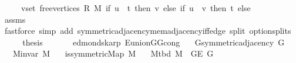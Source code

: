 \begin{isabellebody}
\ \ \ \ \ {\isacharparenleft}{\kern0pt}{\isasymUnion}v{\isasymin}set\ {\isacharparenleft}{\kern0pt}free{\isacharunderscore}{\kern0pt}vertices\ R\ M{\isacharparenright}{\kern0pt}{\isachardot}{\kern0pt}\ if\ u\ {\isacharequal}{\kern0pt}\ t\ then\ {\isacharbraceleft}{\kern0pt}v{\isacharbraceright}{\kern0pt}\ else\ if\ u\ {\isacharequal}{\kern0pt}\ v\ then\ {\isacharbraceleft}{\kern0pt}t{\isacharbraceright}{\kern0pt}\ else\ {\isacharbraceleft}{\kern0pt}{\isacharbraceright}{\kern0pt}{\isacharparenright}{\kern0pt}{\isachardoublequoteclose}\isanewline
\ \ \ \ \isamarkupfalse%
\ assms{\isacharparenleft}{\kern0pt}{}{\isacharcomma}{\kern0pt}\ {}{\isacharparenright}{\kern0pt}\isanewline
\ \ \ \ \isamarkupfalse%
\ {\isacharparenleft}{\kern0pt}fastforce\ simp\ add{\isacharcolon}{\kern0pt}\ symmetric{\isacharunderscore}{\kern0pt}adjacency{\isachardot}{\kern0pt}mem{\isacharunderscore}{\kern0pt}adjacency{\isacharunderscore}{\kern0pt}iff{\isacharunderscore}{\kern0pt}edge\ split{\isacharcolon}{\kern0pt}\ option{\isachardot}{\kern0pt}splits{\isacharparenleft}{\kern0pt}{}{\isacharparenright}{\kern0pt}{\isacharparenright}{\kern0pt}\isanewline
\ \ \isamarkupfalse%
\ \isamarkupfalse%
\ {\isacharquery}{\kern0pt}thesis\isanewline
\ \ \ \ \isacommand{{\isachardot}{\kern0pt}}\isamarkupfalse%
\isanewline
{}\isamarkupfalse%
%
\endisatagproof
{\isafoldproof}%
%
\isadelimproof
\isanewline
%
\endisadelimproof
%
\isadeliminvisible
\isanewline
%
\endisadeliminvisible
%
\isataginvisible
{}\isamarkupfalse%
\ {\isacharparenleft}{\kern0pt}\ edmonds{\isacharunderscore}{\kern0pt}karp{\isacharparenright}{\kern0pt}\ E{\isacharunderscore}{\kern0pt}union{\isacharunderscore}{\kern0pt}G{}{\isacharunderscore}{\kern0pt}G{}{\isacharunderscore}{\kern0pt}cong{\isacharcolon}{\kern0pt}\isanewline
\ \ \ {\isachardoublequoteopen}G{\isachardot}{\kern0pt}symmetric{\isacharunderscore}{\kern0pt}adjacency{\isacharprime}{\kern0pt}\ G{\isachardoublequoteclose}\isanewline
\ \ \ {\isachardoublequoteopen}M{\isachardot}{\kern0pt}invar\ M{\isachardoublequoteclose}\isanewline
\ \ \ {\isachardoublequoteopen}is{\isacharunderscore}{\kern0pt}symmetric{\isacharunderscore}{\kern0pt}Map\ M{\isachardoublequoteclose}\isanewline
\ \ \ {\isachardoublequoteopen}M{\isacharunderscore}{\kern0pt}tbd\ M\ {\isasymsubseteq}\ G{\isachardot}{\kern0pt}E\ G{\isachardoublequoteclose}\isanewline

\end{isabellebody}
